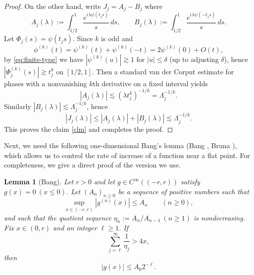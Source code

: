\documentclass[11pt]{amsart}
\newtheorem{lemma}[theorem]{Lemma}
\newcommand{\1}{{\rm 1\hspace*{-0.4ex}%
			\rule{0.1ex}{1.52ex}\hspace*{0.2ex}}}
\numberwithin{equation}{section}
\begin{document}
\begin{proof}
	
	On the other hand, write $J_j=A_j-B_j$ where
	\[
	A_j(\lambda):=\int_{1/2}^1 \frac{e^{i\lambda\psi(t_js)}}{s}\,ds,
	\qquad
	B_j(\lambda):=\int_{1/2}^1 \frac{e^{i\lambda\psi(-t_js)}}{s}\,ds.
	\]
Let $\Phi_j(s)=\psi(t_js)$. 
	Since $k$ is odd and
\[
\phi^{(k)}(t)=\psi^{(k)}(t)+\psi^{(k)}(-t)=2\psi^{(k)}(0)+O(t),
\]
by \eqref{eq:finite-type} we have $|\psi^{(k)}(u)|\gtrsim 1$ for $|u|\le\delta$
	(up to adjusting $\delta$), hence $|\Phi_j^{(k)}(s)|\gtrsim t_j^k$ on $[1/2,1]$. Then a standard van der Corput estimate for phases with a nonvanishing $k$th derivative on a fixed interval yields
	\[
	|A_j(\lambda)|\lesssim (\lambda t_j^k)^{-1/k}=\Lambda_j^{-1/k}.
	\]
	Similarly $|B_j(\lambda)|\lesssim \Lambda_j^{-1/k}$, hence
	\begin{equation}\label{eq:large}
		|J_j(\lambda)|\le |A_j(\lambda)|+|B_j(\lambda)|\lesssim \Lambda_j^{-1/k}.
	\end{equation}
	This proves the claim \eqref{clm} and completes the proof.\end{proof}
	
	
	Next, we need the following one-dimensional Bang's lemma (Bang \cite[Equation (14)]{bang}, Bruna \cite[Lemma 2.5]{bruna}), which allows us to control the rate of increase of a function near a flat point. For completeness, we give a direct proof of the version we use.
\begin{lemma}[Bang]\label{lem:BB}
	Let $r>0$ and let $g\in C^\infty((-r,r))$ satisfy $g(x)=0\ (x\le 0).$
	Let $(A_n)_{n\ge 0}$ be a sequence of positive numbers such that
	\[
	\sup_{x\in (-r,r)}|g^{(n)}(x)|\le A_n\qquad (n\ge 0),
	\]
	and such that the quotient sequence
$\eta_n:=A_n/A_{n-1}\ (n\ge 1)$
	is nondecreasing. Fix $x\in(0,r)$ and an integer $\ell\ge 1$. If
	\[
	\sum_{j=\ell}^{\infty}\frac1{\eta_j}> 4x,
	\]
	then
	\[
	|g(x)|\le A_0 2^{-\ell}.
	\]
\end{lemma}
\end{document}

